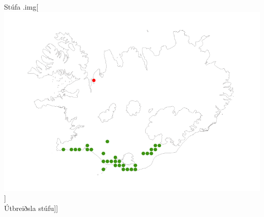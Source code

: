 \documentclass[
]{article}
\begin{document}
Stúfa .img{[}\includegraphics{myndir/kort.png}{]}\\
Útbreiðsla stúfu{]}{]}
\end{document}
